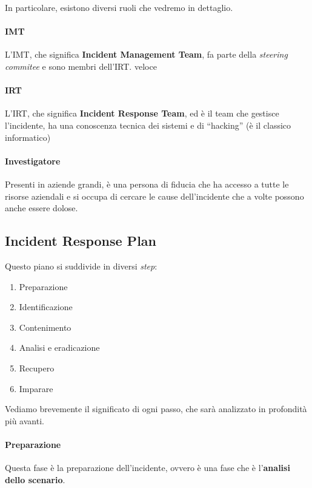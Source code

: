 In particolare, esistono diversi ruoli che vedremo in dettaglio.

\paragraph*{IMT} L'IMT, che significa \textbf{Incident Management Team}, fa
parte della \textit{steering commitee} e sono membri dell'IRT. %
veloce




\paragraph*{IRT} L'IRT, che significa \textbf{Incident Response Team}, ed è il
team che gestisce l'incidente, ha una conoscenza tecnica dei sistemi e di
``hacking'' (è il classico informatico)

\paragraph*{Investigatore} Presenti in aziende grandi, è una persona di fiducia
che ha accesso a tutte le risorse aziendali e si occupa di cercare le cause
dell'incidente che a volte possono anche essere dolose.



\subsection{Incident Response Plan}

Questo piano si suddivide in diversi \textit{step}:
\begin{enumerate}
\item Preparazione
\item Identificazione
\item Contenimento
\item Analisi e eradicazione
\item Recupero
\item Imparare
\end{enumerate}

Vediamo brevemente il significato di ogni passo, che sarà analizzato in
profondità più avanti.

\paragraph*{Preparazione} Questa fase è la preparazione dell'incidente, ovvero è
una fase che è l'\textbf{analisi dello scenario}.

